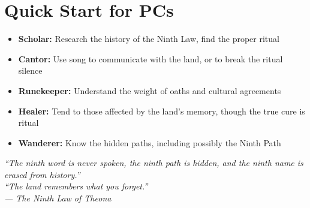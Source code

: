 \documentclass[11pt]{article}
\begin{document}
\section*{Quick Start for PCs}

\begin{itemize}
    \item \textbf{Scholar:} Research the history of the Ninth Law, find the proper ritual
    \item \textbf{Cantor:} Use song to communicate with the land, or to break the ritual silence
    \item \textbf{Runekeeper:} Understand the weight of oaths and cultural agreements
    \item \textbf{Healer:} Tend to those affected by the land's memory, though the true cure is ritual
    \item \textbf{Wanderer:} Know the hidden paths, including possibly the Ninth Path
\end{itemize}

\begin{center}
    \textit{``The ninth word is never spoken, the ninth path is hidden, and the ninth name is erased from history.''} \\
    \textit{``The land remembers what you forget.''} \\
    \textit{--- The Ninth Law of Theona}
\end{center}


\end{document}
